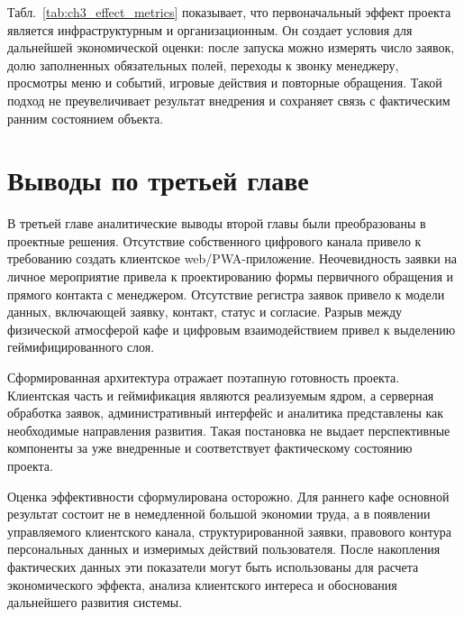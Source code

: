 Табл.~\ref{tab:ch3_effect_metrics} показывает, что первоначальный эффект проекта является инфраструктурным и организационным. Он создает условия для дальнейшей экономической оценки: после запуска можно измерять число заявок, долю заполненных обязательных полей, переходы к звонку менеджеру, просмотры меню и событий, игровые действия и повторные обращения. Такой подход не преувеличивает результат внедрения и сохраняет связь с фактическим ранним состоянием объекта.

\section{Выводы по третьей главе}

В третьей главе аналитические выводы второй главы были преобразованы в проектные решения. Отсутствие собственного цифрового канала привело к требованию создать клиентское web/PWA-приложение. Неочевидность заявки на личное мероприятие привела к проектированию формы первичного обращения и прямого контакта с менеджером. Отсутствие регистра заявок привело к модели данных, включающей заявку, контакт, статус и согласие. Разрыв между физической атмосферой кафе и цифровым взаимодействием привел к выделению геймифицированного слоя.

Сформированная архитектура отражает поэтапную готовность проекта. Клиентская часть и геймификация являются реализуемым ядром, а серверная обработка заявок, административный интерфейс и аналитика представлены как необходимые направления развития. Такая постановка не выдает перспективные компоненты за уже внедренные и соответствует фактическому состоянию проекта.

Оценка эффективности сформулирована осторожно. Для раннего кафе основной результат состоит не в немедленной большой экономии труда, а в появлении управляемого клиентского канала, структурированной заявки, правового контура персональных данных и измеримых действий пользователя. После накопления фактических данных эти показатели могут быть использованы для расчета экономического эффекта, анализа клиентского интереса и обоснования дальнейшего развития системы.
